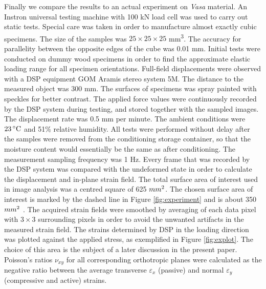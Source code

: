 \documentclass[review]{elsarticle}
\begin{document}
Finally we compare the results to an actual experiment on \textit{Vasa}
material.
An Instron universal testing machine with 100 kN load cell was used to carry out static tests. 
Special care was taken in order to manufacture almost exactly cubic specimens. 
The size of the samples was  $25\times25\times25$ mm\textsuperscript{3}.  The
accuracy for parallelity between the opposite edges of the cube was 0.01 mm. 
Initial tests were conducted on dummy wood specimens in order to find the approximate elastic loading range for all specimen orientations.
Full-field displacements were observed with a DSP equipment GOM Aramis stereo system 5M.
The distance to the measured object was 300 mm. The surfaces of specimens was spray
painted with speckles for better contrast. The applied force values were continuously recorded by the DSP system during testing, and stored together with the sampled images. The displacement rate was 0.5 mm per minute. 
The ambient conditions were $23\,^{\circ}{\rm C}$ and 51\% relative humidity.
All tests were performed without delay after the samples were removed from the conditioning storage container, so that the moisture content would essentially be the same as after conditioning. The measurement sampling frequency was 1 Hz. 
Every frame that was recorded by the DSP system was compared with the undeformed state in order to calculate the displacement and in-plane strain field. 
The total surface area of interest used in image analysis was a centred square
of 625 $mm\textsuperscript{2}$.
The chosen surface area of interest is marked by the dashed line in Figure
\ref{fig:experiment} and is about 350 $mm\textsuperscript{2}$ . The acquired
strain fields were smoothed by averaging of each data pixel with $3\times3$ surrounding pixels in order to avoid the
unwanted artifacts in the measured strain field.
The strains determined by DSP in the loading direction was plotted against the
applied stress, as exemplified in Figure \ref{fig:explot}. The choice of this
area is the subject of a later discussion in the present paper.
Poisson's ratios $\nu_{xy}$ for all corresponding orthotropic planes were
calculated as the negative ratio between the average transverse
$\varepsilon_{x}$ (passive) and normal $\varepsilon_{y}$ (compressive and
active) strains.
\end{document}
